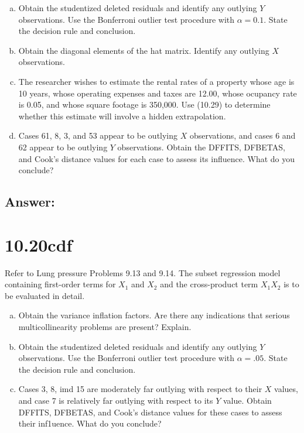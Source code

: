 \documentclass{article}
\begin{document}
\begin{enumerate}[a)]
\item{} Obtain the studentized deleted residuals and identify any outlying $Y$ observations. Use the Bonferroni outlier test procedure with $\alpha{} = 0.1$. State the decision rule and conclusion.
\item{} Obtain the diagonal elements of the hat matrix. Identify any outlying $X$ observations.
\item{} The researcher wishes to estimate the rental rates of a property whose age is 10 years, whose operating expenses and taxes are 12.00, whose ocupancy rate is 0.05, and whose square footage is 350,000. Use (10.29) to determine whether this estimate will involve a hidden extrapolation.
\item{} Cases 61, 8, 3, and 53 appear to be outlying $X$ observations, and cases 6 and 62 appear to be outlying $Y$ observations. Obtain the DFFITS, DFBETAS, and Cook's distance values for each case to assess its influence. What do you conclude?
\end{enumerate}

\subsection{Answer:}

\section{10.20cdf}

Refer to Lung pressure Problems 9.13 and 9.14. The subset regression model containing first-order terms for $X_1$ and $X_2$ and the cross-product term $X_1X_2$ is to be evaluated in detail.

\begin{enumerate}[a)]
\item{} Obtain the variance inflation factors. Are there any indications that serious multicollinearity problems are present? Explain.
\item{} Obtain the studentized deleted residuals and identify any outlying $Y$ observations. Use the Bonferroni outlier test procedure with $\alpha{} = .05$. State the decision rule and conclusion.
\item{} Cases 3, 8, imd 15 are moderately far outlying with respect to their $X$ values, and case 7 is relatively far outlying with respect to its $Y$ value. Obtain DFFITS, DFBETAS, and Cook's distance values for these cases to assess their inf1uence. What do you conclude?
\end{enumerate}
\end{document}
